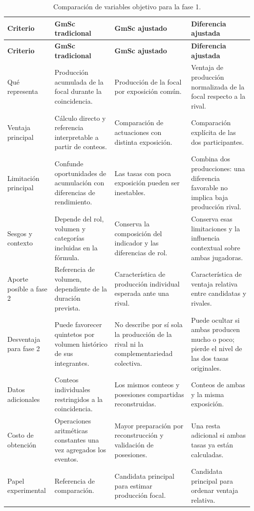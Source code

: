 \begingroup
\small
\setlength{\tabcolsep}{3pt}
\renewcommand{\arraystretch}{1.15}
\begin{longtable}{@{}p{2.3cm}p{3.55cm}p{3.55cm}p{3.55cm}@{}}
\caption{Comparación de variables objetivo para la fase 1.}
\label{tab:comparacion-objetivos-fase1}\\
\toprule
\textbf{Criterio} & \textbf{GmSc tradicional} & \textbf{GmSc ajustado} & \textbf{Diferencia ajustada}\\
\midrule
\endfirsthead
\toprule
\textbf{Criterio} & \textbf{GmSc tradicional} & \textbf{GmSc ajustado} & \textbf{Diferencia ajustada}\\
\midrule
\endhead
\bottomrule
\endfoot
Qué representa & Producción acumulada de la focal durante la coincidencia. & Producción de la focal por exposición común. & Ventaja de producción normalizada de la focal respecto a la rival.\\
Ventaja principal & Cálculo directo y referencia interpretable a partir de conteos. & Comparación de actuaciones con distinta exposición. & Comparación explícita de las dos participantes.\\
Limitación principal & Confunde oportunidades de acumulación con diferencias de rendimiento. & Las tasas con poca exposición pueden ser inestables. & Combina dos producciones: una diferencia favorable no implica baja producción rival.\\
Sesgos y contexto & Depende del rol, volumen y categorías incluidas en la fórmula. & Conserva la composición del indicador y las diferencias de rol. & Conserva esas limitaciones y la influencia contextual sobre ambas jugadoras.\\
Aporte posible a fase 2 & Referencia de volumen, dependiente de la duración prevista. & Característica de producción individual esperada ante una rival. & Característica de ventaja relativa entre candidatas y rivales.\\
Desventaja para fase 2 & Puede favorecer quintetos por volumen histórico de sus integrantes. & No describe por sí sola la producción de la rival ni la complementariedad colectiva. & Puede ocultar si ambas producen mucho o poco; pierde el nivel de las dos tasas originales.\\
Datos adicionales & Conteos individuales restringidos a la coincidencia. & Los mismos conteos y posesiones compartidas reconstruidas. & Conteos de ambas y la misma exposición.\\
Costo de obtención & Operaciones aritméticas constantes una vez agregados los eventos. & Mayor preparación por reconstrucción y validación de posesiones. & Una resta adicional si ambas tasas ya están calculadas.\\
Papel experimental & Referencia de comparación. & Candidata principal para estimar producción focal. & Candidata principal para ordenar ventaja relativa.\\
\end{longtable}
\endgroup

